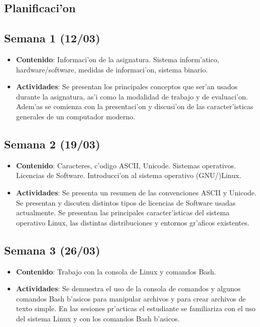 \documentclass[letterpaper,11pt]{exam}
\begin{document}
\begin{multicols}{2}
\newpage
\section{Planificaci'on}
\begin{scriptsize}

\subsection*{Semana 1 (12/03)}
\begin{itemize}
\item \textbf{Contenido}: Informaci'on de la asignatura. Sistema inform'atico, hardware/software, medidas de informaci'on, sistema binario.
\item \textbf{Actividades}: Se presentan los principales conceptos que ser'an usados durante la asignatura, as'i como la modalidad de trabajo y de evaluaci'on. Adem'as se comienza con la presentaci'on y discusi'on de las caracter'isticas generales de un computador moderno.
\end{itemize}

\subsection*{Semana 2 (19/03)}
\begin{itemize}
\item \textbf{Contenido}: Caracteres, c'odigo ASCII, Unicode. Sistemas operativos. Licencias de Software. Introducci'on al sistema operativo (GNU/)Linux. 
\item \textbf{Actividades}: Se presenta un resumen de las convenciones ASCII y Unicode. Se presentan y discuten distintos tipos de licencias de Software usadas actualmente. Se presentan las principales caracter'isticas del sistema operativo Linux, las distintas distribuciones y entornos gr'aficos existentes. 
\end{itemize}

\subsection*{Semana 3 (26/03)}
\begin{itemize}
\item \textbf{Contenido}: Trabajo con la consola de Linux y comandos Bash. 
\item \textbf{Actividades}: Se demuestra el uso de la consola de comandos y algunos comandos Bash b'asicos para manipular archivos y para crear archivos de texto simple. En las sesiones pr'acticas el estudiante se familiariza con el uso del sistema Linux y con los comandos Bash b'asicos.
\end{itemize}


\end{scriptsize}
\end{multicols}
\end{document}
